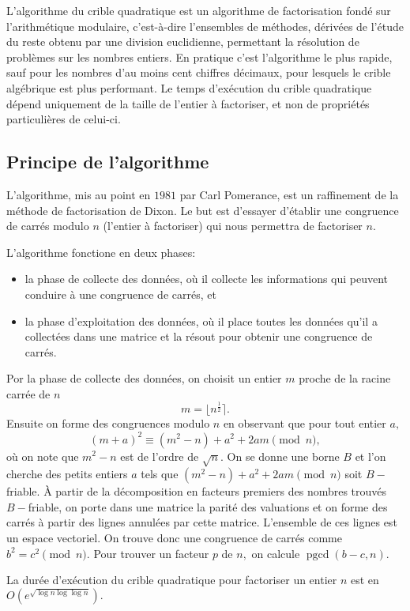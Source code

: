\documentclass[french, 12pt, titlepage]{article}
\newenvironment{itemH}[0]{\begin{itemize}[label=$\bullet$, font=\color{black} \large]}{\end{itemize}}
\DeclareMathOperator{\pgcd}{pgcd}
\begin{document}
L'algorithme du crible quadratique est un algorithme de factorisation fondé sur l'arithmétique modulaire, c'est-à-dire l'ensembles de méthodes, dérivées de l'étude du reste obtenu par une division euclidienne, permettant la résolution de problèmes sur les nombres entiers. En pratique c'est l'algorithme le plus rapide, sauf pour les nombres d'au moins cent chiffres décimaux, pour lesquels le crible algébrique est plus performant.
Le temps d'exécution du crible quadratique dépend uniquement de la taille de l'entier à factoriser, et non de propriétés particulières de celui-ci.

\subsection{Principe de l'algorithme}

L'algorithme, mis au point en $1981$ par Carl Pomerance, est un raffinement de la méthode de factorisation de Dixon. Le but est d'essayer d'établir une congruence de carrés modulo $n$ (l'entier à factoriser) qui nous permettra de factoriser $n.$

L'algorithme fonctione en deux phases:
\begin{itemH}
\item la phase de collecte des données, où il collecte les informations qui peuvent conduire à une congruence de carrés, et
\item la phase d'exploitation des données, où il place toutes les données qu'il a collectées dans une matrice et la résout pour obtenir une congruence de carrés.
\end{itemH}

Por la phase de collecte des données, on choisit un entier $m$ proche de la racine carrée de $n$ \[ m = \lfloor n^{\frac{1}{2}} \rceil .\]
Ensuite on forme des congruences modulo $n$ en observant que pour tout entier $a,$ \[ (m + a)^2 \equiv (m^2 - n) + a^2 + 2am \pmod n , \] où on note que $m^2 - n$ est de l'ordre de $\sqrt{n}.$
On se donne une borne $B$ et l'on cherche des petits entiers $a$ tels que $(m^2 - n) + a^2 + 2am \pmod n$ soit $B-$friable.
{\`A} partir de la décomposition en facteurs premiers des nombres trouvés $B-$friable, on porte dans une matrice la parité des valuations et on forme des carrés à partir des lignes annulées par cette matrice. L'ensemble de ces lignes est un espace vectoriel. On trouve donc une congruence de carrés comme $b^2 = c^2 \pmod n.$ Pour trouver un facteur $p$ de $n,$ on calcule $\pgcd(b - c, n).$

La durée d'exécution du crible quadratique pour factoriser un entier $n$ est en $O(e^{\sqrt{\log n \log \log n}}).$
\end{document}
